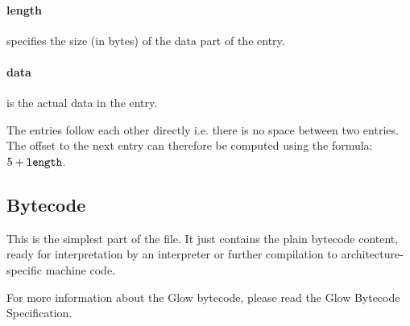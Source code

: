 \documentclass[12pt]{article}
\begin{document}
\paragraph{length} specifies the size (in bytes) of the data part of the entry.

\paragraph{data} is the actual data in the entry.

The entries follow each other directly i.e. there is no space between two entries. The offset
to the next entry can therefore be computed using the formula: \(5 + \verb|length|\).


\subsection*{Bytecode}

This is the simplest part of the file. It just contains the plain bytecode content, ready for interpretation
by an interpreter or further compilation to architecture-specific machine code.

For more information about the Glow bytecode, please read the Glow Bytecode Specification.
\end{document}
